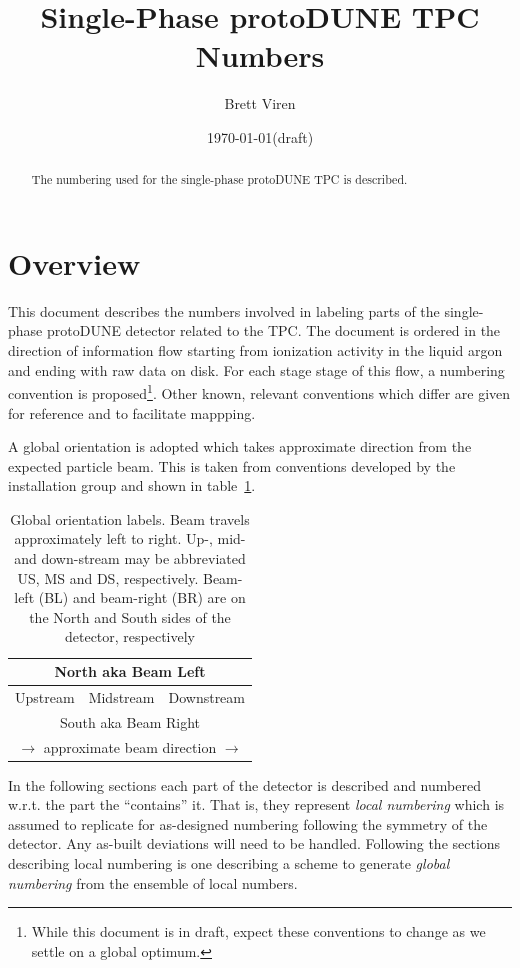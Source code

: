 \documentclass[pdftex,12pt,letter]{article}
\author{Brett Viren}
\date{\today (draft)}
\title{Single-Phase protoDUNE TPC Numbers}
\begin{document}
\maketitle

\begin{abstract}
The numbering used for the single-phase protoDUNE TPC is described.
\end{abstract}


\section{Overview}

This document describes the numbers involved in labeling parts of the
single-phase protoDUNE detector related to the TPC.  The document is
ordered in the direction of information flow starting from ionization
activity in the liquid argon and ending with raw data on disk.  For
each stage stage of this flow, a numbering convention is
proposed\footnote{While this document is in draft, expect these
  conventions to change as we settle on a global optimum.}.  Other
known, relevant conventions which differ are given for reference and
to facilitate mappping.

A global orientation is adopted which takes approximate direction from
the expected particle beam.  This is taken from conventions developed
by the installation group and shown in table~\ref{tab:global}.

\begin{table}[htp]
  \label{tab:global}
  \centering
  \begin{tabular}[h]{|c|c|c|}
    \hline
    \multicolumn{3}{|c|}{North aka Beam Left} \\
    \hline
    Upstream & Midstream & Downstream \\
    \hline
    \multicolumn{3}{|c|}{South aka Beam Right} \\
    \hline
    \multicolumn{3}{c}{$\longrightarrow$ approximate beam direction $\longrightarrow$} \\    
  \end{tabular}
  \caption{Global orientation labels.  Beam travels approximately left to
    right.  Up-, mid- and down-stream may be abbreviated US, MS and
    DS, respectively.  Beam-left (BL) and beam-right (BR) are on the
    North and South sides of the detector, respectively}
\end{table}

In the following sections each part of the detector is described and
numbered w.r.t. the part the ``contains'' it.  That is, they represent
\textit{local numbering} which is assumed to replicate for as-designed
numbering following the symmetry of the detector.  Any as-built
deviations will need to be handled.  Following the sections describing
local numbering is one describing a scheme to generate \textit{global
  numbering} from the ensemble of local numbers.
\end{document}
